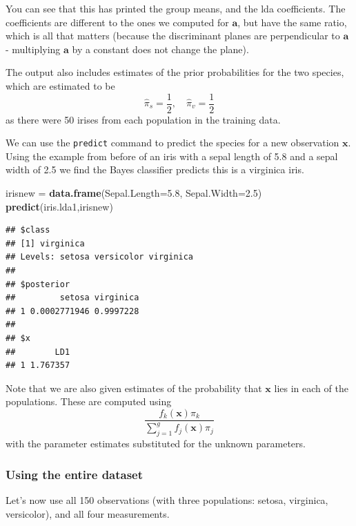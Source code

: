 \documentclass[
]{book}
\newenvironment{Shaded}{\begin{snugshade}}{\end{snugshade}}
\newcommand{\AttributeTok}[1]{\textcolor[rgb]{0.13,0.29,0.53}{#1}}
\newcommand{\FloatTok}[1]{\textcolor[rgb]{0.00,0.00,0.81}{#1}}
\newcommand{\FunctionTok}[1]{\textcolor[rgb]{0.13,0.29,0.53}{\textbf{#1}}}
\newcommand{\NormalTok}[1]{#1}
\newcommand{\OtherTok}[1]{\textcolor[rgb]{0.56,0.35,0.01}{#1}}
\theoremstyle{definition}
\theoremstyle{definition}
\theoremstyle{definition}
\theoremstyle{definition}
\theoremstyle{remark}
\begin{document}
You can see that this has printed the group means, and the lda coefficients. The coefficients are different to the ones we computed for \(\mathbf a\), but have the same ratio, which is all that matters (because the discriminant planes are perpendicular to \(\mathbf a\) - multiplying \(\mathbf a\) by a constant does not change the plane).

The output also includes estimates of the prior probabilities for the two species, which are estimated to be
\[\hat{\pi}_s = \frac{1}{2}, \quad \hat{\pi}_v = \frac{1}{2}\]
as there were 50 irises from each population in the training data.

We can use the \texttt{predict} command to predict the species for a new observation \(\mathbf x\). Using the example from before of an iris with a sepal length of 5.8 and a sepal width of 2.5 we find the Bayes classifier predicts this is a virginica iris.

\begin{Shaded}
\begin{Highlighting}[]
\NormalTok{irisnew }\OtherTok{=} \FunctionTok{data.frame}\NormalTok{(}\AttributeTok{Sepal.Length=}\FloatTok{5.8}\NormalTok{, }\AttributeTok{Sepal.Width=}\FloatTok{2.5}\NormalTok{)}
\FunctionTok{predict}\NormalTok{(iris.lda1,irisnew)}
\end{Highlighting}
\end{Shaded}

\begin{verbatim}
## $class
## [1] virginica
## Levels: setosa versicolor virginica
## 
## $posterior
##         setosa virginica
## 1 0.0002771946 0.9997228
## 
## $x
##        LD1
## 1 1.767357
\end{verbatim}

Note that we are also given estimates of the probability that \(\mathbf x\) lies in each of the populations. These are computed using
\[\frac{f_k(\mathbf x)\pi_k}{\sum_{j=1}^g f_j(\mathbf x)\pi_j}\]
with the parameter estimates substituted for the unknown parameters.

\subsubsection*{Using the entire dataset}\label{using-the-entire-dataset}

Let's now use all 150 observations (with three populations: setosa, virginica, versicolor), and all four measurements.
\end{document}
